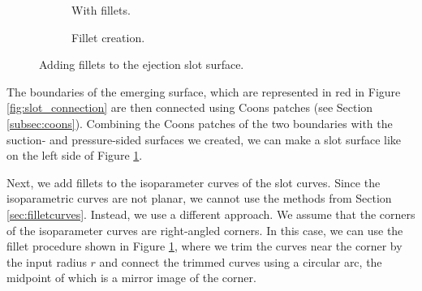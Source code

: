 \documentclass[a4paper, 11pt]{report}
\theoremstyle{definition}
\begin{document}
\begin{figure}[H]
\begin{subfigure}{.39\textwidth}
			\caption{With fillets.}
		\end{subfigure}
		\begin{subfigure}{.2\textwidth}
			
			\vspace{1cm}
			\caption{Fillet creation.}
		\end{subfigure}
		\caption{Adding fillets to the ejection slot surface.}
		\label{fig:slot_coon}
	\end{figure}

	The boundaries of the emerging surface, which are represented in red in Figure \ref{fig:slot_connection} are then connected using Coons patches (see Section \ref{subsec:coons}). Combining the Coons patches of the two boundaries with the suction- and pressure-sided surfaces we created, we can make a slot surface like on the left side of Figure \ref{fig:slot_coon}.

	Next, we add fillets to the isoparameter curves of the slot curves. Since the isoparametric curves are not planar, we cannot use the methods from Section \ref{sec:filletcurves}. Instead, we use a different approach. We assume that the corners of the isoparameter curves are right-angled corners. In this case, we can use the fillet procedure shown in Figure \ref{fig:slot_coon}, where we trim the curves near the corner by the input radius $r$ and connect the trimmed curves using a circular arc, the midpoint of which is a mirror image of the corner.
\end{document}
